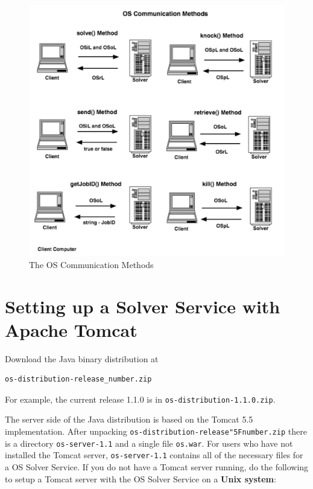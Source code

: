 \documentclass[11pt]{article}
\newcommand{\figurepath}{./figures}
\renewcommand{\_}{{\char"5F}}
\renewcommand{\{}{{\char"7B}}
\renewcommand{\}}{{\char"7D}}
\renewcommand{\^}{{\char"0D}}
\renewcommand{\'}{{\char"0D}}
\begin{document}
\begin{enumerate}[Step 1:]
\begin{figure}[ht]
\centering
\includegraphics[scale=0.5]{./figures/osCommunicationMethods.pdf}
\caption{The OS Communication Methods}
\label{figure:osCommunicationMethods}
\end{figure}




\section{Setting up a Solver Service with Apache Tomcat}\label{section:tomcat}

Download the Java binary distribution at
\begin{verbatim}
os-distribution-release_number.zip
\end{verbatim}

For example, the current release 1.1.0 is in {\tt os-distribution-1.1.0.zip}.


The server side of the Java distribution is based on the Tomcat 5.5 implementation. After unpacking 
{\tt os-distribution-release\_number.zip} there is a directory {\tt os-server-1.1} and a single file {\tt os.war}.  
For users who have not installed the Tomcat server,   {\tt os-server-1.1} contains  all of the necessary files 
for a OS Solver Service.  If you do not have a Tomcat server running, do the following to setup a  Tomcat server  
with the OS Solver Service on a {\bf Unix system}:


\end{enumerate}
\end{document}
